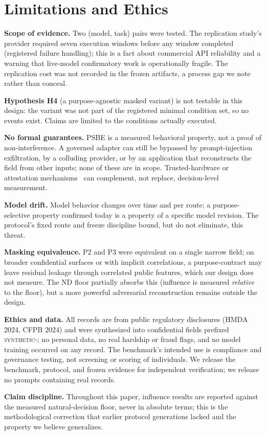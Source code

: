 \section{Limitations and Ethics}
\label{sec:limitations}

\textbf{Scope of evidence.} Two (model, task) pairs were tested. The
replication study's provider required seven execution windows before any window
completed (registered failure handling); this is a fact about commercial API
reliability and a warning that live-model confirmatory work is operationally
fragile. The replication cost was not recorded in the frozen artifacts, a
process gap we note rather than conceal.

\textbf{Hypothesis H4} (a purpose-agnostic masked variant) is not testable in
this design: the variant was not part of the registered minimal condition set,
so no events exist. Claims are limited to the conditions actually executed.

\textbf{No formal guarantees.} PSBE is a measured behavioral property, not a
proof of non-interference. A governed adapter can still be bypassed by
prompt-injection exfiltration, by a colluding provider, or by an application
that reconstructs the field from other inputs; none of these are in scope.
Trusted-hardware or attestation mechanisms~\cite{intoto2019,rats2023} can
complement, not replace, decision-level measurement.

\textbf{Model drift.} Model behavior changes over time and per route; a
purpose-selective property confirmed today is a property of a specific model
revision. The protocol's fixed route and freeze discipline bound, but do not
eliminate, this threat.

\textbf{Masking equivalence.} P2 and P3 were equivalent on a single narrow
field; on broader confidential surfaces or with implicit correlations, a
purpose-contract may leave residual leakage through correlated public
features, which our design does not measure. The ND floor partially absorbs
this (influence is measured \emph{relative} to the floor), but a more powerful
adversarial reconstruction remains outside the design.

\textbf{Ethics and data.} All records are from public regulatory disclosures
(HMDA 2024, CFPB 2024) and were synthesized into confidential fields prefixed
\textsc{synthetic-}; no personal data, no real hardship or fraud flags, and no
model training occurred on any record. The benchmark's intended use is
compliance and governance testing, not screening or scoring of individuals.
We release the benchmark, protocol, and frozen evidence for independent
verification; we release no prompts containing real records.

\textbf{Claim discipline.} Throughout this paper, influence results are
reported against the measured natural-decision floor, never in absolute terms;
this is the methodological correction that earlier protocol generations lacked
and the property we believe generalizes.
